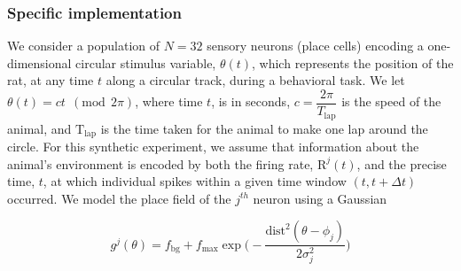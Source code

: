 \subsubsection{Specific implementation}
We consider a population of $N=32$ sensory neurons (place cells) encoding a 
one-dimensional circular stimulus variable, $\theta(t)$, which represents 
the position of the rat, at any time $t$ along a circular track, during
a behavioral task.
We let $\theta(t) = c t \ \ (\text{mod} \ \ 2\pi)$, where time $t$, is in seconds, $c = \dfrac{2\pi}{T_{\text{lap}}}$ is the speed of the animal, and
$\text{T}_{\text{lap}}$ is the time taken for the animal to make one lap around the circle.
For this synthetic experiment, we assume that information about the animal's
environment is encoded by both the firing rate, $\text{R}^{j}(t)$,
and the precise time, $t$, at which individual spikes within a given time window
$(t, t+\Delta t)$ occurred.
We model the place field of the $j^{th}$ neuron using a Gaussian 

\begin{equation}
{g}^{j}(\theta) = \displaystyle  f_{\text{bg}} + f_{\max} 
\exp\bigg(-\dfrac{\text{dist}^{2}(\theta - \phi_{j})}{2\sigma_{j}^{2}} \bigg)
\end{equation}


